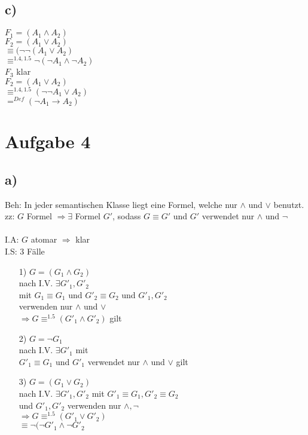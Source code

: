 \documentclass[a4paper]{scrartcl}
\begin{document}
\subsection*{c)}

$F_1 = (A_1 \wedge A_2)$\\
$F_2 = (A_1 \vee A_2)$\\
$\equiv (\neg \neg (A_1 \vee A_2)$\\
$\equiv^{1.4, 1.5} \neg ( \neg A_1 \wedge \neg A_2)$\\
$F_3$ klar\\
$F_2 = (A_1 \vee A_2)$\\
$\equiv^{1.4, 1.5} ( \neg \neg A_1 \vee A_2)$\\
$=^{Def} (\neg A_1 \rightarrow A_2)$\\


\section*{Aufgabe 4}

\subsection*{a)}

Beh: In jeder semantischen Klasse liegt eine Formel, welche nur $\wedge$ und $\vee$ benutzt.\\
zz: $G$ Formel $\Rightarrow \exists$ Formel $G'$, sodass $G \equiv G'$ und $G'$ verwendet nur $\wedge$ und $\neg$\\

\noindent\\
I.A: $G$ atomar $\Rightarrow$ klar\\
I.S: 3 Fälle
\begin{enumerate}
\item[1)] $G = (G_1 \wedge G_2 ) $\\
nach I.V. $\exists G'_1, G'_2$\\
mit $G_1 \equiv G_1$ und $G'_2 \equiv G_2$ und $G'_1, G'_2$\\
verwenden nur $\wedge$ und $\vee$\\
$\Rightarrow G \equiv^{1.5} (G'_1 \wedge G'_2)$ gilt

\item[2)] $G = \neg G_1$\\
nach I.V. $\exists G'_1$ mit\\
$G'_1 \equiv G_1$ und $G'_1$ verwendet nur $\wedge$ und $\vee$ gilt

\item[3)] $G = (G_1 \vee G_2)$\\
nach I.V. $\exists G'_1, G'_2$ mit $G'_1 \equiv G_1, G'_2 \equiv G_2$\\
und $G'_1, G'_2$ verwenden nur $\wedge, \neg$\\
$\Rightarrow G \equiv^{1.5} (G'_1 \vee G'_2)$\\
$\equiv \neg ( \neg G'_1 \wedge \neg G'_2$
\end{enumerate}
\end{document}
